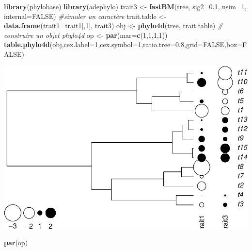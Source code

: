 \documentclass[
]{book}
\newenvironment{Shaded}{\begin{snugshade}}{\end{snugshade}}
\newcommand{\AttributeTok}[1]{\textcolor[rgb]{0.13,0.29,0.53}{#1}}
\newcommand{\CommentTok}[1]{\textcolor[rgb]{0.56,0.35,0.01}{\textit{#1}}}
\newcommand{\ConstantTok}[1]{\textcolor[rgb]{0.56,0.35,0.01}{#1}}
\newcommand{\DecValTok}[1]{\textcolor[rgb]{0.00,0.00,0.81}{#1}}
\newcommand{\FloatTok}[1]{\textcolor[rgb]{0.00,0.00,0.81}{#1}}
\newcommand{\FunctionTok}[1]{\textcolor[rgb]{0.13,0.29,0.53}{\textbf{#1}}}
\newcommand{\NormalTok}[1]{#1}
\newcommand{\OtherTok}[1]{\textcolor[rgb]{0.56,0.35,0.01}{#1}}
\begin{document}
\begin{Shaded}
\begin{Highlighting}[]
\FunctionTok{library}\NormalTok{(phylobase)}
\FunctionTok{library}\NormalTok{(adephylo)}
\NormalTok{trait3 }\OtherTok{\textless{}{-}} \FunctionTok{fastBM}\NormalTok{(tree, }\AttributeTok{sig2=}\FloatTok{0.1}\NormalTok{, }\AttributeTok{nsim=}\DecValTok{1}\NormalTok{, }\AttributeTok{internal=}\ConstantTok{FALSE}\NormalTok{) }\CommentTok{\#simuler un caractère}
\NormalTok{trait.table }\OtherTok{\textless{}{-}} \FunctionTok{data.frame}\NormalTok{(}\AttributeTok{trait1=}\NormalTok{trait1[,}\DecValTok{1}\NormalTok{], trait3)}
\NormalTok{obj }\OtherTok{\textless{}{-}} \FunctionTok{phylo4d}\NormalTok{(tree, trait.table) }\CommentTok{\# construire un objet phylo4d}
\NormalTok{op }\OtherTok{\textless{}{-}} \FunctionTok{par}\NormalTok{(}\AttributeTok{mar=}\FunctionTok{c}\NormalTok{(}\DecValTok{1}\NormalTok{,}\DecValTok{1}\NormalTok{,}\DecValTok{1}\NormalTok{,}\DecValTok{1}\NormalTok{))}
\FunctionTok{table.phylo4d}\NormalTok{(obj,}\AttributeTok{cex.label=}\DecValTok{1}\NormalTok{,}\AttributeTok{cex.symbol=}\DecValTok{1}\NormalTok{,}\AttributeTok{ratio.tree=}\FloatTok{0.8}\NormalTok{,}\AttributeTok{grid=}\ConstantTok{FALSE}\NormalTok{,}\AttributeTok{box=}\ConstantTok{FALSE}\NormalTok{)}
\end{Highlighting}
\end{Shaded}

\includegraphics{pcm-workshop_files/figure-latex/Plot continuous parameter - table.phylo4d-1.pdf}

\begin{Shaded}
\begin{Highlighting}[]
\FunctionTok{par}\NormalTok{(op)}
\end{Highlighting}
\end{Shaded}
\end{document}
